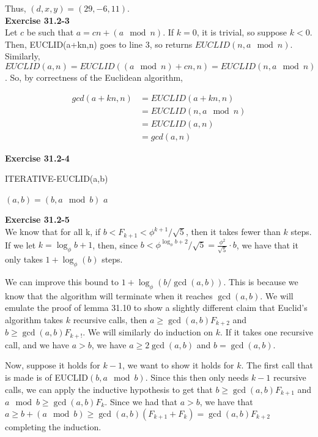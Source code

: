 \documentclass{article}
\begin{document}
Thus, $(d,x,y) = (29,-6,11)$. \\

\noindent\textbf{Exercise 31.2-3}\\

Let $c$ be such that $a = cn +(a\mod n)$. If $k=0$, it is trivial, so suppose $k<0$. Then, EUCLID(a+kn,n) goes to line 3, so returns $EUCLID(n, a\mod n)$. Similarly, $EUCLID(a,n) = EUCLID((a\mod n) + cn, n) = EUCLID(n,a\mod n)$. So, by correctness of the Euclidean algorithm,

\begin{align*}
gcd(a+kn,n) &= EUCLID(a+kn,n)\\
& =  EUCLID(n,a\mod n)\\
& = EUCLID(a,n)\\
& = gcd(a,n)
\end{align*}

\noindent\textbf{Exercise 31.2-4}\\

\begin{algorithm}
\caption{ITERATIVE-EUCLID(a,b)}
\begin{algorithmic}[1]
	\State $(a,b) = (b, a \mod b)$
\EndWhile
\State \Return $a$
\end{algorithmic}
\end{algorithm}

\noindent\textbf{Exercise 31.2-5}\\

We know that for all k, if $b < F_{k+1} < \phi^{k+1}/\sqrt{5}$, then it takes fewer than $k$ steps. If we let $k = \log_\phi{b} + 1$, then, since $b < \phi^{\log_\phi{b} + 2}/\sqrt{5} = \frac{\phi^2}{\sqrt{5}} \cdot b$, we have that it only takes $1+\log_\phi(b)$ steps.

We can improve this bound to $1 + \log_{\phi}(b/\gcd(a,b))$. This is because we know that the algorithm will terminate when it reaches $\gcd(a,b)$. We will emulate the proof of lemma 31.10 to show a slightly different claim that Euclid's algorithm takes $k$ recursive calls, then $a \ge \gcd(a,b) F_{k+2}$ and $b \ge \gcd(a,b) F_{k+!}$. We will similarly do induction on $k$. If it takes one recursive call, and we have $a>b$, we have $a \ge 2\gcd(a,b)$ and $b=\gcd(a,b)$.

Now, suppose it holds for $k-1$, we want to show it holds for $k$. The first call that is made is of EUCLID$(b,a\mod b)$. Since this then only needs $k-1$ recursive calls, we can apply the inductive hypothesis to get that $b \ge \gcd(a,b) F_{k+1}$ and $a\mod b \ge \gcd(a,b) F_{k}$. Since we had that $a > b$, we have that $a \ge b + (a\mod b) \ge \gcd(a,b) ( F_{k+1} + F_{k}) = \gcd(a,b) F_{k+2}$ completing the induction.
\end{document}
